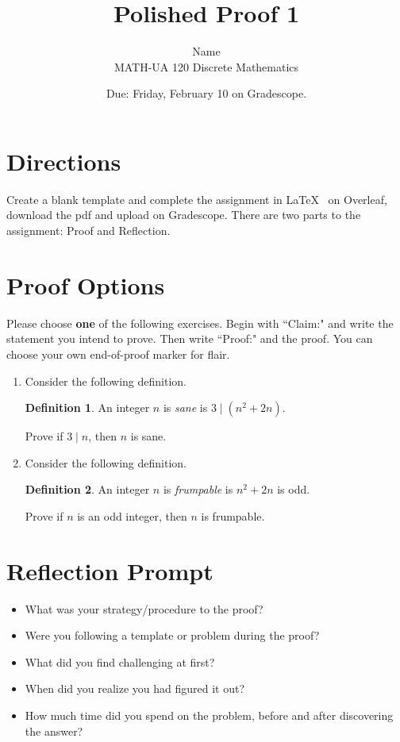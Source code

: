 \documentclass{article}
\title{Polished Proof 1}
\author{%
	Name
	\\
	MATH-UA 120 Discrete Mathematics
}
\date{Due: Friday, February 10 on Gradescope.}
\theoremstyle{definition}
\newtheorem*{definition}{Definition}
\begin{document}
    \maketitle
	
\section*{Directions}
    Create a blank template and complete the assignment in \LaTeX~  on Overleaf, 
    download the pdf and upload on Gradescope. There are two parts to the assignment: Proof and Reflection.

\section*{Proof Options}
    Please choose \textbf{one} of the following exercises. Begin with ``Claim:" and write the statement you intend to prove. 
    Then write ``Proof:" and the proof. You can choose your own end-of-proof marker for flair.
    \begin{enumerate}
	\item Consider the following definition.
	    \begin{definition}
	        An integer $n$ is \emph{sane} is $3 \mid (n^2+2n)$.
	    \end{definition}
	    Prove if $3 \mid n$, then $n$ is sane.
	\item Consider the following definition.
	    \begin{definition}
	        An integer $n$ is \emph{frumpable} is $n^2+2n$ is odd.  
	    \end{definition}
	    Prove if $n$ is an odd integer, then $n$ is frumpable.
    \end{enumerate}

\section*{Reflection Prompt}
    \begin{itemize}
        \item What was your strategy/procedure to the proof?
        \item Were you following a template or problem during the proof?
        \item What did you find challenging at first?
        \item When did you realize you had figured it out?
        \item How much time did you spend on the problem, before and after discovering the answer?
    \end{itemize}
\end{document}
